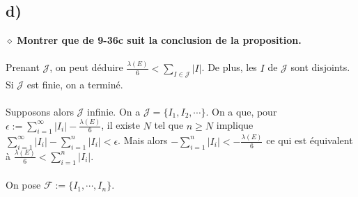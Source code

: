 \documentclass[a4paper,10pt]{article}
\begin{document}
\subsection*{d)}
$\diamond$ \textbf{Montrer que de 9-36c suit la conclusion de la proposition.}
\\
\\
Prenant $\mathcal{J}$, on peut déduire $\frac{\lambda(E)}{6} < \sum_{I \in \mathcal{J}} |I|$. De plus, les $I$ de $\mathcal{J}$ sont disjoints. Si $\mathcal{J}$ est finie, on a terminé.
\\
\\
Supposons alors $\mathcal{J}$ infinie. On a $\mathcal{J} = \{ I_1, I_2, \cdots\}$. On a que, pour $\epsilon := \sum_{i=1}^\infty |I_i| - \frac{\lambda(E)}{6}$, il existe $N$ tel que $n \geq N$ implique $\sum_{i=1}^\infty |I_i| - \sum_{i=1}^n |I_i| < \epsilon$. Mais alors $-\sum_{i=1}^n |I_i| < -\frac{\lambda(E)}{6}$ ce qui est équivalent à $\frac{\lambda(E)}{6} < \sum_{i=1}^n |I_i|$. 
\\
\\
On pose $\mathcal{F} := \{I_1, \cdots, I_n \}$.   
\end{document}
